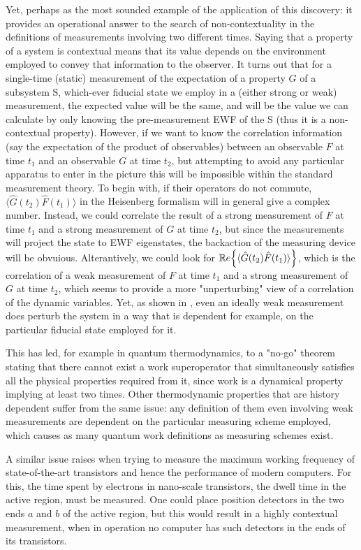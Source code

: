 \documentclass[11pt, a4paper]{article} %
\begin{document}
Yet, perhaps as the most sounded example of the application of this discovery: it provides an operational answer to the search of non-contextuality in the definitions of measurements involving two different times. Saying that a property of a system is contextual means that its value depends on the environment employed to convey that information to the observer. It turns out that for a single-time (static) measurement of the expectation of a property $G$ of a subsystem S, which-ever fiducial state we employ in a (either strong or weak) measurement, the expected value will be the same, and will be the value we can calculate by only knowing the pre-measurement EWF of the S (thus it is a non-contextual property). However, if we want to know the correlation information (say the expectation of the product of observables) between an observable $F$ at time $t_1$ and an observable $G$ at time $t_2$, but attempting to avoid any particular apparatus to enter in the picture this will be impossible within the standard measurement theory. To begin with, if their operators do not commute, $\langle \hat{G}(t_2)\hat{F}(t_1)\rangle$ in the Heisenberg formalism will in general give a complex number. Instead, we could correlate the result of a strong measurement of $F$ at time $t_1$ and a strong measurement of $G$ at time $t_2$, but since the measurements will project the state to EWF eigenstates, the backaction of the measuring device will be obvuious. Alterantively, we could look for $\mathbb{R}e \qty{\langle \hat{G}(t_2)\hat{F}(t_1)\rangle}$, which is the correlation of a weak measurement of $F$ at time $t_1$ and a strong measurement of $G$ at time $t_2$, which seems to provide a more "unperturbing" view of a correlation of the dynamic variables. Yet, as shown in \cite{DevInPosition1}, even an ideally weak measurement does perturb the system in a way that is dependent for example, on the particular fiducial state employed for it.

This has led, for example in quantum thermodynamics, to a "no-go" theorem \cite{nogo} stating that there cannot exist a work superoperator that simultaneously satisfies all the physical properties required from it, since work is a dynamical property implying at least two times. Other thermodynamic properties that are history dependent suffer from the same issue: any definition of them even involving weak measurements are dependent on the particular measuring scheme employed, which causes as many quantum work definitions as measuring schemes exist.

A similar issue raises when trying to measure the maximum working frequency of state-of-the-art transistors and hence the performance of modern computers. For this, the time spent by electrons in nano-scale transistors, the dwell time in the active region, must be measured. One could place position detectors in the two ends $a$ and $b$ of the active region, but this would result in a highly contextual measurement, when in operation no computer has such detectors in the ends of its transistors. 
\end{document}
